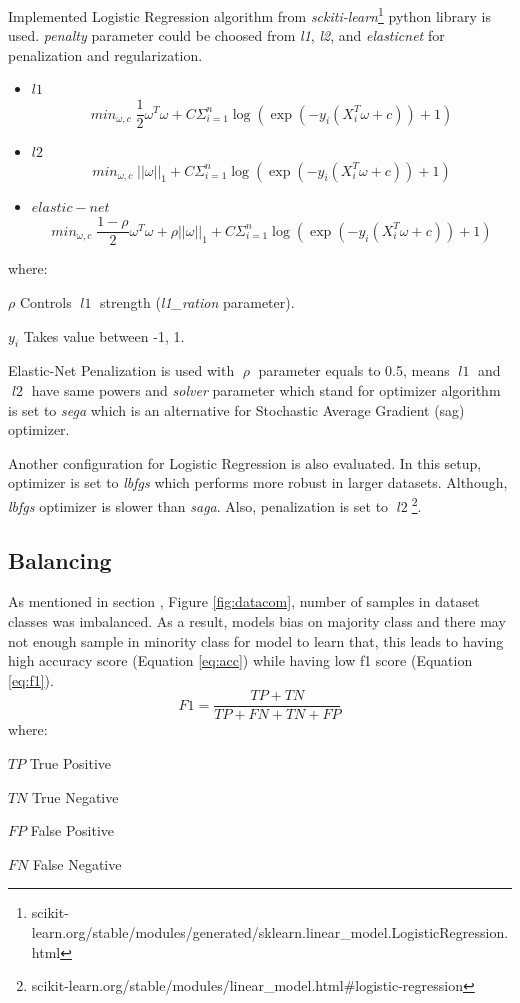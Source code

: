 Implemented Logistic Regression algorithm from \textit{sckiti-learn}\footnote{scikit-learn.org/stable/modules/generated/sklearn.linear\_model.LogisticRegression.html} python library is used. \textit{penalty} parameter could be choosed from \textit{l1}, \textit{l2}, and \textit{elasticnet} for penalization and regularization.
\begin{itemize}
	\item $l1$
		\[ min_{\omega,c} \; \frac{1}{2}\omega^{T}\omega + C \Sigma_{i=1}^{n} \log\left(\exp\left(-y_{i}\left(X^{T}_{i}\omega + c \right)\right) + 1 \right) \]
	\item $l2$
		\[ min_{\omega,c} \; \left|\left|\omega\right|\right|_{1} + C \Sigma_{i=1}^{n} \log\left(\exp\left(-y_{i}\left(X^{T}_{i}\omega + c \right)\right) + 1 \right) \]
	\item $elastic-net$
		\[ min_{\omega,c} \; \frac{1-\rho}{2}\omega^{T}\omega +\rho\left|\left|\omega\right|\right|_{1} + C \Sigma_{i=1}^{n} \log\left(\exp\left(-y_{i}\left(X^{T}_{i}\omega + c \right)\right) + 1 \right) \]
\end{itemize}
where:
\begin{eqexpl}[25mm]
	\item{$\rho$} Controls $\; l1 \;$ strength (\textit{l1\_ration} parameter).
	\item{$y_{i}$} Takes value between -1, 1.
\end{eqexpl}
\bigbreak
Elastic-Net Penalization is used with $\; \rho \;$ parameter equals to 0.5, means $\;l1\;$ and $\;l2\;$ have same powers and \textit{solver} parameter which stand for optimizer algorithm is set to \textit{sega} which is an alternative for Stochastic Average Gradient (sag) optimizer. 

Another configuration for Logistic Regression is also evaluated. In this setup, optimizer is set to \textit{lbfgs} which performs more robust in larger datasets. Although, \textit{lbfgs} optimizer is slower than \textit{saga}.  Also, penalization is set to $\; l2 \;$\footnote{scikit-learn.org/stable/modules/linear\_model.html\#logistic-regression}.

\subsection{Balancing}
As mentioned in section , Figure \ref{fig:datacom}, number of samples in dataset classes was imbalanced. As a result, models bias on majority class and there may not enough sample in minority class for model to learn that, this leads to having high accuracy score (Equation \ref{eq:acc}) while having low f1 score (Equation \ref{eq:f1}).  
\begin{equation}
\label{eq:acc}
F1 = \frac{TP + TN }{TP + FN + TN + FP}
\end{equation}
where:
\begin{eqexpl}[25mm]
	\item{$TP$} True Positive
	\item{$TN$} True Negative
	\item{$FP$} False Positive 
	\item{$FN$} False Negative
\end{eqexpl}

